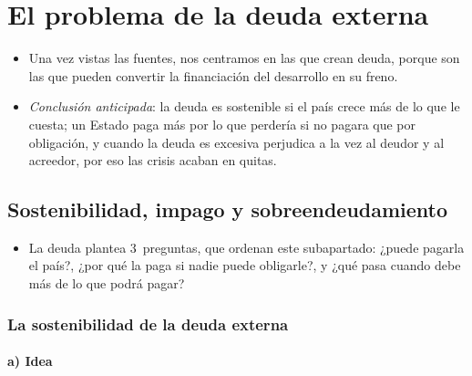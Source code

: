 \documentclass[11pt]{article}
\begin{document}
\section{El problema de la deuda externa}\label{sec:deuda}

\begin{itemize}
\item Una vez vistas las fuentes, nos centramos en las que crean deuda, porque son las que pueden convertir la financiación del desarrollo en su freno.
\item \emph{Conclusión anticipada}: la deuda es sostenible si el país crece más de lo que le cuesta; un Estado paga más por lo que perdería si no pagara que por obligación, y cuando la deuda es excesiva perjudica a la vez al deudor y al acreedor, por eso las crisis acaban en quitas.
\end{itemize}

\subsection{Sostenibilidad, impago y sobreendeudamiento}\label{sec:sostenibilidad-impago}

\begin{itemize}
\item La deuda plantea 3~preguntas, que ordenan este subapartado: ¿puede pagarla el país?, ¿por qué la paga si nadie puede obligarle?, y ¿qué pasa cuando debe más de lo que podrá pagar?
\end{itemize}

\subsubsection{La sostenibilidad de la deuda externa}\label{sec:sostenibilidad}

\paragraph{a) Idea}
\end{document}
